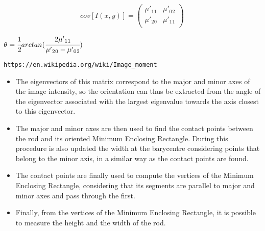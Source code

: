 \documentclass[11pt]{article}
\providecommand{\tightlist}{%
      \setlength{\itemsep}{0pt}\setlength{\parskip}{0pt}}
\begin{document}
\begin{equation}
    cov[I(x, y)] = 
    \begin{pmatrix}
        \mu'{}_1{}_1 & \mu'{}_0{}_2 \\
        \mu'{}_2{}_0 & \mu'{}_1{}_1 \\
    \end{pmatrix}
\end{equation}
\begin{center}
    $\theta = \cfrac{1}{2}arctan(\cfrac{2\mu'{}_1{}_1}{\mu'{}_2{}_0 - \mu'{}_0{}_2})$     
\end{center}

\begin{verbatim}
https://en.wikipedia.org/wiki/Image_moment
\end{verbatim}

\begin{itemize}
\tightlist
\item
  The eigenvectors of this matrix correspond to the major and minor axes
  of the image intensity, so the orientation can thus be extracted from
  the angle of the eigenvector associated with the largest eigenvalue
  towards the axis closest to this eigenvector.
\item
  The major and minor axes are then used to find the contact points
  between the rod and its oriented Minimum Enclosing Rectangle. During
  this procedure is also updated the width at the barycentre considering
  points that belong to the minor axis, in a similar way as the contact
  points are found.
\item
  The contact points are finally used to compute the vertices of the
  Minimum Enclosing Rectangle, considering that its segments are
  parallel to major and minor axes and pass through the first.
\item
  Finally, from the vertices of the Minimum Enclosing Rectangle, it is
  possible to measure the height and the width of the rod.
\end{itemize}
\end{document}
